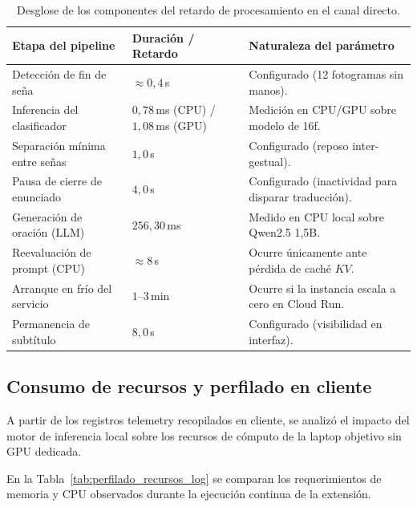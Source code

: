 \begin{table}[H]
    \centering
    \small
    \caption{Desglose de los componentes del retardo de procesamiento en el canal directo.}
    \label{tab:latencias_etapas}
    \begin{tabularx}{\textwidth}{@{}>{\raggedright\arraybackslash}p{} >{\raggedright\arraybackslash}p{} >{\raggedright\arraybackslash}X@{}}
        \toprule
        \textbf{Etapa del pipeline} & \textbf{Duración / Retardo} & \textbf{Naturaleza del parámetro} \\
        \midrule
        Detección de fin de seña & $\approx 0{,}4$\,s & Configurado (12 fotogramas sin manos). \\
        Inferencia del clasificador & $0{,}78$\,ms (CPU) / $1{,}08$\,ms (GPU) & Medición en CPU/GPU sobre modelo de 16f. \\
        Separación mínima entre señas & $1{,}0$\,s & Configurado (reposo inter-gestual). \\
        Pausa de cierre de enunciado & $4{,}0$\,s & Configurado (inactividad para disparar traducción). \\
        Generación de oración (LLM) & $256{,}30$\,ms & Medido en CPU local sobre Qwen2.5 1,5B. \\
        Reevaluación de prompt (CPU) & $\approx 8$\,s & Ocurre únicamente ante pérdida de caché $KV$. \\
        Arranque en frío del servicio & $1$--$3$\,min & Ocurre si la instancia escala a cero en Cloud Run. \\
        Permanencia de subtítulo & $8{,}0$\,s & Configurado (visibilidad en interfaz). \\
        \bottomrule
    \end{tabularx}
\end{table}


\subsection{Consumo de recursos y perfilado en cliente}
\label{sec:perfilado_cliente_recursos}

A partir de los registros telemetry recopilados en cliente, se analizó el impacto del motor de inferencia local sobre los recursos de cómputo de la laptop objetivo sin GPU dedicada.

En la Tabla~\ref{tab:perfilado_recursos_log} se comparan los requerimientos de memoria y CPU observados durante la ejecución continua de la extensión.

